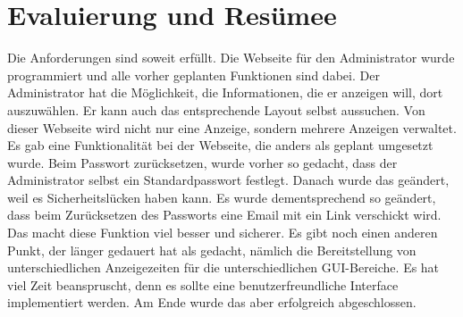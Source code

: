 \section{Evaluierung und Resümee}

Die Anforderungen sind soweit erfüllt. Die Webseite f\"ur den Administrator  wurde programmiert und alle vorher geplanten Funktionen sind dabei. Der Administrator hat die Möglichkeit, die Informationen, die er anzeigen will, dort auszuwählen. Er kann auch das entsprechende Layout selbst aussuchen. Von dieser Webseite wird nicht nur eine Anzeige, sondern mehrere Anzeigen verwaltet. Es gab eine Funktionalität bei der Webseite, die anders als geplant umgesetzt wurde. Beim Passwort zurücksetzen, wurde vorher so gedacht, dass der Administrator selbst ein Standardpasswort festlegt. Danach wurde das geändert, weil es Sicherheitslücken haben kann. Es wurde dementsprechend so geändert, dass beim Zurücksetzen des Passworts eine Email mit ein Link verschickt wird. Das macht diese Funktion viel besser und sicherer. Es gibt noch einen anderen Punkt, der länger gedauert hat als gedacht, n\"amlich die Bereitstellung von unterschiedlichen Anzeigezeiten für die unterschiedlichen GUI-Bereiche. Es hat viel Zeit beanspruscht, denn es sollte eine benutzerfreundliche Interface implementiert werden. Am Ende wurde das aber erfolgreich abgeschlossen.

